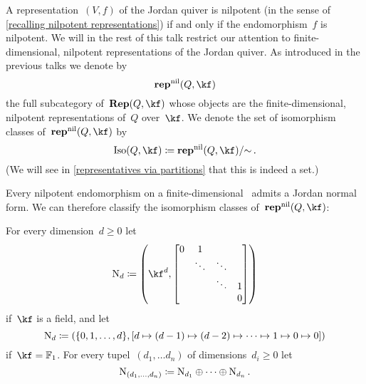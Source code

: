 \documentclass[a4paper,11pt]{scrartcl}
\begin{document}
A representation~$(V, f)$ of the Jordan quiver is nilpotent (in the sense of \cref{recalling nilpotent representations}) if and only if the endomorphism~$f$ is nilpotent.
We will in the rest of this talk restrict our attention to finite-dimensional, nilpotent representations of the Jordan quiver.
As introduced in the previous talks we denote by
\[
  \repnil(Q, \kf)
\]
the full subcategory of~$\Rep(Q, \kf)$ whose objects are the finite-dimensional, nilpotent representations of~$Q$ over~$\kf$.
We denote the set of isomorphism classes of~$\repnil(Q, \kf)$ by
\[
  \Iso(Q, \kf)
  \defined
  \repnil(Q, \kf) / {\sim} \,.
\]
(We will see in \cref{representatives via partitions} that this is indeed a set.)

Every nilpotent endomorphism on a finite-dimensional~\vectorspace{$\kf$} admits a Jordan normal form.
We can therefore classify the isomorphism classes of~$\repnil(Q, \kf)$:

\begin{definition}
  For every dimension~$d \geq 0$ let
  \[
    \Nil_d
    \defined
    \left(
      \kf^d,
      \begin{bmatrix}
        0 & 1       &         &   \\
          & \ddots  & \ddots  &   \\
          &         & \ddots  & 1 \\
          &         &         & 0
      \end{bmatrix}
    \right)
  \]
  if~$\kf$ is a field, and let
  \[
    \mathrm{N}_d
    \coloneqq
    (
      \{ 0, 1, \dotsc, d \},
      [d \mapsto (d-1) \mapsto (d-2) \mapsto \dotsb \mapsto 1 \mapsto 0 \mapsto 0]
    )
  \]
  if~$\kf = \Finite_1$.
  For every tupel~$(d_1, \dotsc d_n)$ of dimensions~$d_i \geq 0$ let
  \[
    \mathrm{N}_{(d_1, \dotsc, d_n)}
    \coloneqq
    \mathrm{N}_{d_1} \oplus \dotsb \oplus \mathrm{N}_{d_n} \,.
  \]
\end{definition}
\end{document}
